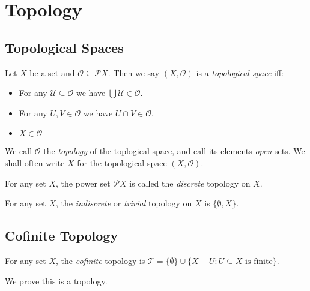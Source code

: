 
\chapter{Topology}

\section{Topological Spaces}

\begin{df}
Let $X$ be a set and $\mathcal{O} \subseteq \mathcal{P} X$. Then we say $(X, \mathcal{O})$ is a \emph{topological space} iff:
\begin{itemize}
\item For any $\mathcal{U} \subseteq \mathcal{O}$ we have $\bigcup \mathcal{U} \in \mathcal{O}$.
\item For any $U, V \in \mathcal{O}$ we have $U \cap V \in \mathcal{O}$.
\item $X \in \mathcal{O}$
\end{itemize}
We call $\mathcal{O}$ the \emph{topology} of the toplogical space, and call its elements \emph{open} sets. We shall often write $X$ for the topological space $(X, \mathcal{O})$.
\end{df}

\begin{ex}
For any set $X$, the power set $\mathcal{P} X$ is called the \emph{discrete} topology on $X$.
\end{ex}

\begin{ex}
For any set $X$, the \emph{indiscrete} or \emph{trivial} topology on $X$ is  $\{ \emptyset, X \}$.
\end{ex}

\section{Cofinite Topology}

\begin{df}
For any set $X$, the \emph{cofinite} topology is $\mathcal{T} = \{\emptyset\} \cup \{ X - U : U \subseteq X \text{ is finite} \}$.

We prove this is a topology.
\end{df}

